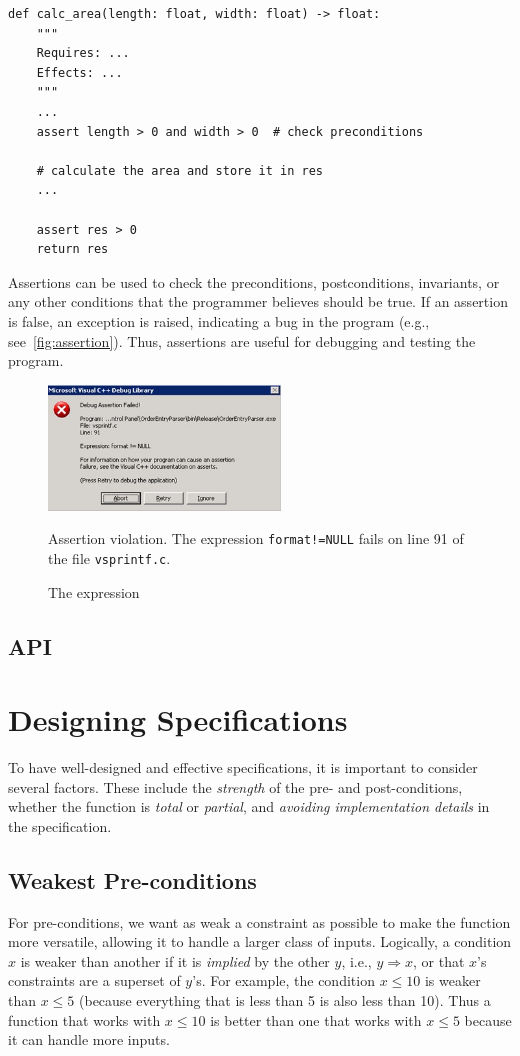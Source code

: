 \documentclass[oneside,11pt,dvipsnames]{book}
\renewcommand{\implies}{\Rightarrow}
\newcommand{\code}[1]{\texttt{#1}}
\begin{document}
\begin{lstlisting}
def calc_area(length: float, width: float) -> float:
    """
    Requires: ... 
    Effects: ...
    """
    ...
    assert length > 0 and width > 0  # check preconditions

    # calculate the area and store it in res
    ... 

    assert res > 0  
    return res 
\end{lstlisting}



Assertions can be used to check the preconditions, postconditions, invariants, or any other conditions that the programmer believes should be true.  If an assertion is false, an exception is raised, indicating a bug in the program (e.g., see~\autoref{fig:assertion}). Thus, assertions are useful for debugging and testing the program. 

\begin{figure}
    \centering
    \includegraphics[width=0.55\textwidth]{figs/assertions.jpg}
    \caption{Assertion violation. The expression \code{format!=NULL} fails on line 91 of the file \code{vsprintf.c}.}\label{fig:assertion}
    \caption{The expression }
\end{figure}

\subsection{API} 

\section{Designing Specifications}\label{sec:design-specifications}

To have well-designed and effective specifications, it is important to consider several factors. These include the \emph{strength} of the pre- and post-conditions, whether the function is \emph{total} or \emph{partial}, and \emph{avoiding implementation details} in the specification.

\subsection{Weakest Pre-conditions}\label{sec:weakest-preconditions}
For pre-conditions, we want as weak a constraint as possible to make the function more versatile, allowing it to handle a larger class of inputs.
Logically, a condition $x$ is weaker than another if it is \emph{implied} by the other $y$, i.e.,  $y \implies x$, or that $x$'s constraints are a superset of $y$'s. For example, the condition $x \le 10$ is weaker than $x \le 5$ (because everything that is less than 5 is also less than 10). Thus a function that works with $x \le 10$ is better than one that works with $x \le 5$ because it can handle more inputs.
\end{document}
